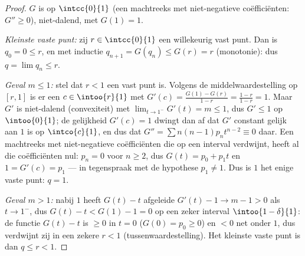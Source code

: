 \begin{proof}
$G$ is  op $\intcc{0}{1}$ (een machtreeks met niet-negatieve
coëfficiënten: $G'' \geq 0$), niet-dalend, met $G(1) = 1$.

\emph{Kleinste vaste punt:} zij $r \in \intcc{0}{1}$ een
willekeurig vast punt. Dan is $q_0 = 0 \leq r$, en met inductie
$q_{n+1} = G(q_n) \leq G(r) = r$ (monotonie): dus $q = \lim q_n
\leq r$.

\emph{Geval $m \leq 1$:} stel dat $r < 1$ een vast punt is. Volgens
de middelwaardestelling op $[r, 1]$ is er een $c \in \intoo{r}{1}$
met $G'(c) = \frac{G(1) - G(r)}{1 - r} = \frac{1 - r}{1 - r} = 1$.
Maar $G'$ is niet-dalend (convexiteit) met $\lim_{t\to1^-}G'(t) = m
\leq 1$, dus $G' \leq 1$ op $\intoo{0}{1}$; de gelijkheid $G'(c) =
1$ dwingt dan af dat $G'$ constant gelijk aan $1$ is op
$\intco{c}{1}$, en dus dat $G'' = \sum n(n-1)p_nt^{n-2} \equiv 0$
daar. Een machtreeks met niet-negatieve coëfficiënten die op een
interval verdwijnt, heeft al die coëfficiënten nul: $p_n = 0$ voor
$n \geq 2$, dus $G(t) = p_0 + p_1t$ en $1 = G'(c) = p_1$ --- in
tegenspraak met de hypothese $p_1 \neq 1$. Dus is $1$ het enige
vaste punt: $q = 1$.

\emph{Geval $m > 1$:} nabij $1$ heeft $G(t) - t$ afgeleide $G'(t) -
1 \to m - 1 > 0$ als $t \to 1^-$, dus $G(t) - t < G(1) - 1 = 0$ op
een zeker interval $\intoo{1 - \delta}{1}$: de  functie
$G(t) - t$ is $\geq 0$ in $t = 0$ ($G(0) = p_0 \geq 0$) en $< 0$
net onder $1$, dus verdwijnt zij in een zekere $r < 1$
(tussenwaardestelling). Het kleinste vaste punt is dan $q \leq r <
1$.
\end{proof}

